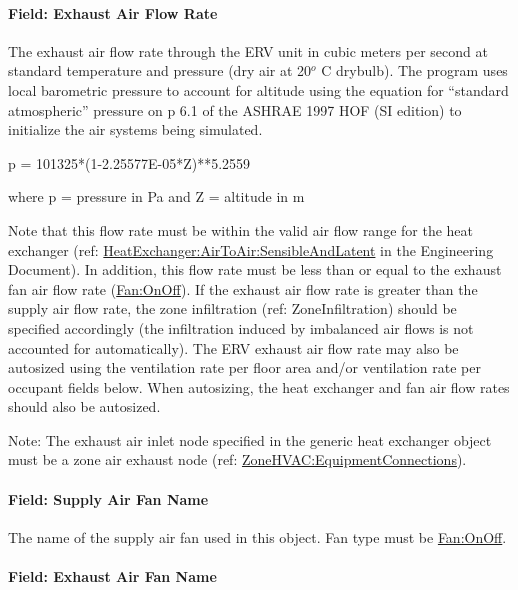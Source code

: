 \paragraph{Field: Exhaust Air Flow Rate}\label{field-exhaust-air-flow-rate-1}

The exhaust air flow rate through the ERV unit in cubic meters per second at standard temperature and pressure (dry air at 20\(^{o}\) \si{C} drybulb). The program uses local barometric pressure to account for altitude using the equation for ``standard atmospheric'' pressure on p 6.1 of the ASHRAE 1997 HOF (SI edition) to initialize the air systems being simulated.

p = 101325*(1-2.25577E-05*Z)**5.2559

where p = pressure in Pa and Z = altitude in m

Note that this flow rate must be within the valid air flow range for the heat exchanger (ref: \hyperref[heatexchangerairtoairsensibleandlatent]{HeatExchanger:AirToAir:SensibleAndLatent} in the Engineering Document). In addition, this flow rate must be less than or equal to the exhaust fan air flow rate (\hyperref[fanonoff]{Fan:OnOff}). If the exhaust air flow rate is greater than the supply air flow rate, the zone infiltration (ref: ZoneInfiltration) should be specified accordingly (the infiltration induced by imbalanced air flows is not accounted for automatically). The ERV exhaust air flow rate may also be autosized using the ventilation rate per floor area and/or ventilation rate per occupant fields below. When autosizing, the heat exchanger and fan air flow rates should also be autosized.

Note: The exhaust air inlet node specified in the generic heat exchanger object must be a zone air exhaust node (ref: \hyperref[zonehvacequipmentconnections]{ZoneHVAC:EquipmentConnections}).

\paragraph{Field: Supply Air Fan Name}\label{field-supply-air-fan-name-7}

The name of the supply air fan used in this object. Fan type must be \hyperref[fanonoff]{Fan:OnOff}.

\paragraph{Field: Exhaust Air Fan Name}\label{field-exhaust-air-fan-name}

